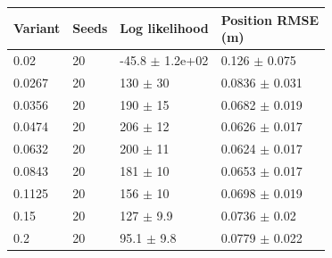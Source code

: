 \begin{tabular}{llll}
\toprule
Variant & Seeds & Log likelihood & \shortstack[l]{Position RMSE\\(m)} \\
\midrule
0.02 & 20 & -45.8 $\pm$ 1.2e+02 & 0.126 $\pm$ 0.075 \\
0.0267 & 20 & 130 $\pm$ 30 & 0.0836 $\pm$ 0.031 \\
0.0356 & 20 & 190 $\pm$ 15 & 0.0682 $\pm$ 0.019 \\
0.0474 & 20 & 206 $\pm$ 12 & 0.0626 $\pm$ 0.017 \\
0.0632 & 20 & 200 $\pm$ 11 & 0.0624 $\pm$ 0.017 \\
0.0843 & 20 & 181 $\pm$ 10 & 0.0653 $\pm$ 0.017 \\
0.1125 & 20 & 156 $\pm$ 10 & 0.0698 $\pm$ 0.019 \\
0.15 & 20 & 127 $\pm$ 9.9 & 0.0736 $\pm$ 0.02 \\
0.2 & 20 & 95.1 $\pm$ 9.8 & 0.0779 $\pm$ 0.022 \\
\bottomrule
\end{tabular}
